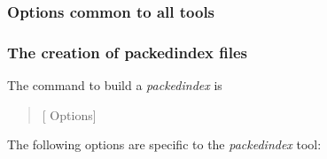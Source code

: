 \documentclass[12pt,titlepage]{article}
\newcommand{\packedindex}{\textit{packedindex}\xspace}
\newcommand{\Suffixerator}{\textit{Suffixerator}\xspace}
\begin{document}
%

\subsubsection{Options common to all tools}
\label{sec:packedindex:commonoptions}

\begin{Justshowoptions}





\end{Justshowoptions}


\subsubsection{The creation of packedindex files}
\label{sec:packedindex:mkindex}

The command to build a \packedindex is
\begin{quote}
  \ttfamily%
     [{\rmfamily
    Options}]  
\end{quote}

The following options are specific to the \packedindex
{} tool:
\end{document}
